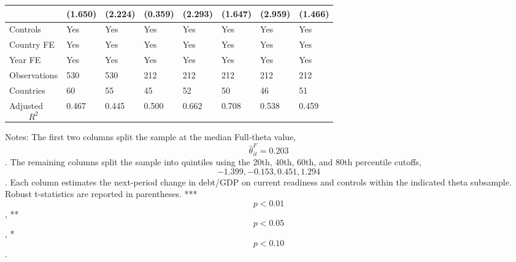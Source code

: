 \begin{table}[H]
\begin{threeparttable}
\begin{tabularx}{\textwidth}{lYYYYYYY}
  & (1.650) & (2.224) & (0.359) & (2.293) & (1.647) & (2.959) & (1.466) \\
\midrule
Controls & Yes & Yes & Yes & Yes & Yes & Yes & Yes \\
Country FE & Yes & Yes & Yes & Yes & Yes & Yes & Yes \\
Year FE & Yes & Yes & Yes & Yes & Yes & Yes & Yes \\
Observations & 530 & 530 & 212 & 212 & 212 & 212 & 212 \\
Countries & 60 & 55 & 45 & 52 & 50 & 46 & 51 \\
Adjusted $$R^2$$ & 0.467 & 0.445 & 0.500 & 0.662 & 0.708 & 0.538 & 0.459 \\
\bottomrule
\end{tabularx}
\begin{tablenotes}[flushleft]\footnotesize
\item Notes: The first two columns split the sample at the median Full-theta value, $$\widehat{\theta}^{F}_{it}=0.203$$. The remaining columns split the sample into quintiles using the 20th, 40th, 60th, and 80th percentile cutoffs, $$-1.399, -0.153, 0.451, 1.294$$. Each column estimates the next-period change in debt/GDP on current readiness and controls within the indicated theta subsample. Robust t-statistics are reported in parentheses. *** $$p<0.01$$, ** $$p<0.05$$, * $$p<0.10$$.
\end{tablenotes}
\end{threeparttable}
\end{table}
